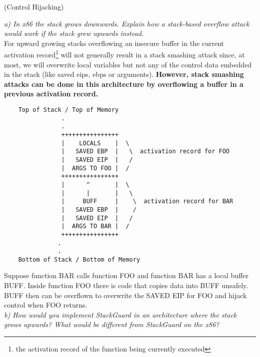 \begin{prob}  (Control Hijacking)
\end{prob}

\noindent \textit{a) In x86 the stack grows downwards. Explain how a stack-based overflow attack would work if the stack grew upwards instead.}\\

\noindent For upward growing stacks overflowing an insecure buffer in the current activation record\footnote{the activation record of the function being currently executed} will not generally result in a stack smashing attack since, at most, we will overwrite local variables but not any of the control data embedded in the stack (like saved eips,  ebps or arguments). \textbf{However, stack smashing attacks can be done in this architecture by overflowing a buffer in a previous activation record. }
\begin{verbatim}
    Top of Stack / Top of Memory
                .
                .
        		++++++++++++++++
        		|    LOCALS    |  \
        		|   SAVED EBP  |   \  activation record for FOO
        		|   SAVED EIP  |   /
        		|  ARGS TO FOO |  /
        		++++++++++++++++
        		|      ^       |  \
        		|      |       |   \
        		|     BUFF     |    \  activation record for BAR  
        		|   SAVED EBP  |    /  
        		|   SAVED EIP  |   /
        		|  ARGS TO BAR |  /
        		++++++++++++++++
               .
               .
    Bottom of Stack / Bottom of Memory
\end{verbatim}
Suppose function BAR calls function FOO and function BAR has a local buffer BUFF. Inside function FOO there is code that copies data into BUFF unsafely. BUFF then can be overflown to overwrite the SAVED EIP for FOO and hijack control when FOO returns.\\

\noindent \textit{b) How would you implement StackGuard in an architecture where the stack grows upwards? What would be different from StackGuard on the x86?}\\

